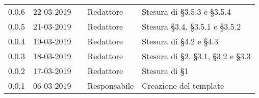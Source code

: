 \begin{center}
\begin{longtable}[H]{p{1.7cm} p{2cm} p{1.8cm} p{2.5cm} p{4cm}}
0.0.6 & 22-03-2019 & \andrea{} & Redattore & Stesura di §3.5.3 e §3.5.4\\
0.0.5 & 21-03-2019 & \andrea{} & Redattore & Stesura §3.4, §3.5.1 e §3.5.2\\
0.0.4 & 19-03-2019 & \francesco{} & Redattore & Stesura di §4.2 e §4.3\\
0.0.3 & 18-03-2019 & \singh{} & Redattore & Stesura di §2, §3.1, §3.2 e §3.3\\
0.0.2 & 17-03-2019 & \andrea{} & Redattore & Stesura di §1\\
0.0.1 & 06-03-2019 & \daniele{} & Responsabile & Creazione del template\\

\end{longtable}
\end{center}

